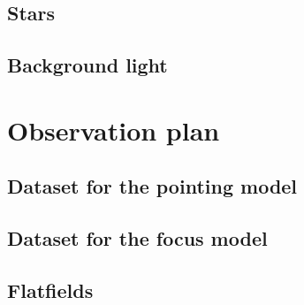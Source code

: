 \documentclass[\docopts]{\docclass}
\begin{document}
\subsection{Stars}
\label{sec:stars}


\subsection{Background light}
\label{sec:background}


\section{Observation plan}
\label{sec:plan}

\subsection{Dataset for the pointing model}
\label{sec:pointingmodel}

\subsection{Dataset for the focus model}
\label{sec:focusmodel}

\subsection{Flatfields}
\label{sec:flatfields}
\end{document}
